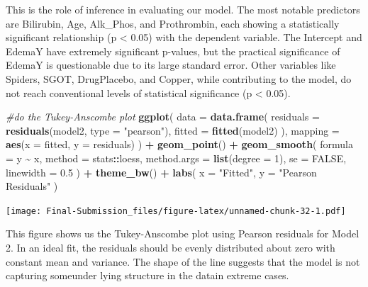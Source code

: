 \documentclass[
]{article}
\newenvironment{Shaded}{\begin{snugshade}}{\end{snugshade}}
\newcommand{\AttributeTok}[1]{\textcolor[rgb]{0.13,0.29,0.53}{#1}}
\newcommand{\CommentTok}[1]{\textcolor[rgb]{0.56,0.35,0.01}{\textit{#1}}}
\newcommand{\ConstantTok}[1]{\textcolor[rgb]{0.56,0.35,0.01}{#1}}
\newcommand{\DecValTok}[1]{\textcolor[rgb]{0.00,0.00,0.81}{#1}}
\newcommand{\FloatTok}[1]{\textcolor[rgb]{0.00,0.00,0.81}{#1}}
\newcommand{\FunctionTok}[1]{\textcolor[rgb]{0.13,0.29,0.53}{\textbf{#1}}}
\newcommand{\NormalTok}[1]{#1}
\newcommand{\SpecialCharTok}[1]{\textcolor[rgb]{0.81,0.36,0.00}{\textbf{#1}}}
\newcommand{\StringTok}[1]{\textcolor[rgb]{0.31,0.60,0.02}{#1}}
\begin{document}
This is the role of inference in evaluating our model. The most notable
predictors are Bilirubin, Age, Alk\_Phos, and Prothrombin, each showing
a statistically significant relationship (p \textless{} 0.05) with the
dependent variable. The Intercept and EdemaY have extremely significant
p-values, but the practical significance of EdemaY is questionable due
to its large standard error. Other variables like Spiders, SGOT,
DrugPlacebo, and Copper, while contributing to the model, do not reach
conventional levels of statistical significance (p \textless{} 0.05).

\begin{Shaded}
\begin{Highlighting}[]
\CommentTok{\#do the Tukey{-}Anscombe plot}
\FunctionTok{ggplot}\NormalTok{(}
  \AttributeTok{data =} \FunctionTok{data.frame}\NormalTok{(}
    \AttributeTok{residuals =} \FunctionTok{residuals}\NormalTok{(model2, }\AttributeTok{type =} \StringTok{"pearson"}\NormalTok{),}
    \AttributeTok{fitted =} \FunctionTok{fitted}\NormalTok{(model2)}
\NormalTok{  ),}
  \AttributeTok{mapping =} \FunctionTok{aes}\NormalTok{(}\AttributeTok{x =}\NormalTok{ fitted, }\AttributeTok{y =}\NormalTok{ residuals)}
\NormalTok{) }\SpecialCharTok{+}
  \FunctionTok{geom\_point}\NormalTok{() }\SpecialCharTok{+}
  \FunctionTok{geom\_smooth}\NormalTok{(}
    \AttributeTok{formula =}\NormalTok{ y }\SpecialCharTok{\textasciitilde{}}\NormalTok{ x,}
    \AttributeTok{method =}\NormalTok{ stats}\SpecialCharTok{::}\NormalTok{loess,}
    \AttributeTok{method.args =} \FunctionTok{list}\NormalTok{(}\AttributeTok{degree =} \DecValTok{1}\NormalTok{),}
    \AttributeTok{se =} \ConstantTok{FALSE}\NormalTok{,}
    \AttributeTok{linewidth =} \FloatTok{0.5}
\NormalTok{  ) }\SpecialCharTok{+}
  \FunctionTok{theme\_bw}\NormalTok{() }\SpecialCharTok{+}
  \FunctionTok{labs}\NormalTok{(}
    \AttributeTok{x =} \StringTok{"Fitted"}\NormalTok{,}
    \AttributeTok{y =} \StringTok{"Pearson Residuals"}
\NormalTok{  )}
\end{Highlighting}
\end{Shaded}

\texttt{[image: Final-Submission\_files/figure-latex/unnamed-chunk-32-1.pdf]}

This figure shows us the Tukey-Anscombe plot using Pearson residuals for
Model 2. In an ideal fit, the residuals should be evenly distributed
about zero with constant mean and variance. The shape of the line
suggests that the model is not capturing someunder lying structure in
the datain extreme cases.
\end{document}
